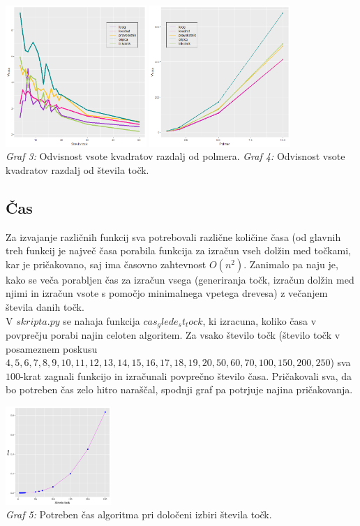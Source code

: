 \documentclass[a4paper]{article}
\begin{document}
\includegraphics[width=0.4\textwidth]{graf1} \hspace{20mm}
\includegraphics[width=0.4\textwidth]{graf2} \\
\hspace{10mm} \scriptsize{\textit{Graf 3: }  Odvisnost vsote kvadratov razdalj od polmera.} \hspace{20mm}
\scriptsize{\textit{Graf 4: }  Odvisnost vsote kvadratov razdalj od števila točk.}


\subsection{Čas}

Za izvajanje različnih funkcij sva potrebovali različne količine časa (od glavnih treh funkcij je največ časa porabila funkcija za izračun vseh dolžin med točkami, kar je pričakovano, saj ima časovno zahtevnost $O(n^2)$. Zanimalo pa naju je, kako se veča porabljen čas za izračun vsega (generiranja točk, izračun dolžin med njimi in izračun vsote s pomočjo minimalnega vpetega drevesa) z večanjem števila danih točk. \\
V \colorbox{gray!10}{$skripta.py$} se nahaja funkcija $cas_glede_st_tock$, ki izracuna, koliko časa v povprečju porabi najin celoten algoritem. Za vsako število točk (število točk v posameznem poskusu $4, 5, 6, 7, 8, 9, 10, 11, 12, 13, 14, 15, 16, 17, 18, 19, 20, 50, 60, 70, 100, 150, 200, 250$) sva $100$-krat zagnali funkcijo in izračunali povprečno število časa. Pričakovali sva, da bo potreben čas zelo hitro naraščal, spodnji graf pa potrjuje najina pričakovanja.
\begin{center}
\includegraphics[width=0.3\textwidth]{graf_cas} \\
\scriptsize{\textit{Graf 5: }  Potreben čas algoritma pri določeni izbiri števila točk.}
\end{center}
\end{document}

